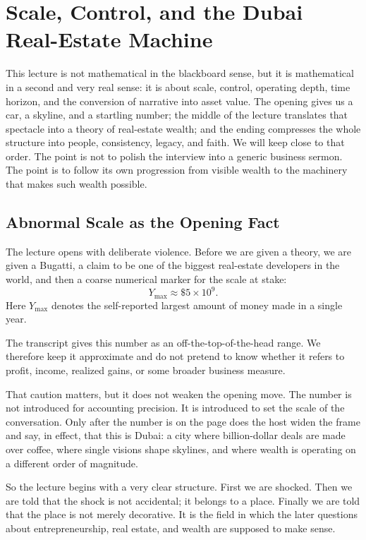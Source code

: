 \chapter{Scale, Control, and the Dubai Real-Estate Machine}

This lecture is not mathematical in the blackboard sense, but it is mathematical in a second and very real sense: it is about scale, control, operating depth, time horizon, and the conversion of narrative into asset value. The opening gives us a car, a skyline, and a startling number; the middle of the lecture translates that spectacle into a theory of real-estate wealth; and the ending compresses the whole structure into people, consistency, legacy, and faith. We will keep close to that order. The point is not to polish the interview into a generic business sermon. The point is to follow its own progression from visible wealth to the machinery that makes such wealth possible.

\section{Abnormal Scale as the Opening Fact}

The lecture opens with deliberate violence. Before we are given a theory, we are given a Bugatti, a claim to be one of the biggest real-estate developers in the world, and then a coarse numerical marker for the scale at stake:
\begin{equation}
Y_{\max} \approx \$5 \times 10^{9}.
\end{equation}
Here \(Y_{\max}\) denotes the self-reported largest amount of money made in a single year.

\begin{remark}
The transcript gives this number as an off-the-top-of-the-head range. We therefore keep it approximate and do not pretend to know whether it refers to profit, income, realized gains, or some broader business measure.
\end{remark}

That caution matters, but it does not weaken the opening move. The number is not introduced for accounting precision. It is introduced to set the scale of the conversation. Only after the number is on the page does the host widen the frame and say, in effect, that this is Dubai: a city where billion-dollar deals are made over coffee, where single visions shape skylines, and where wealth is operating on a different order of magnitude.

So the lecture begins with a very clear structure. First we are shocked. Then we are told that the shock is not accidental; it belongs to a place. Finally we are told that the place is not merely decorative. It is the field in which the later questions about entrepreneurship, real estate, and wealth are supposed to make sense.

